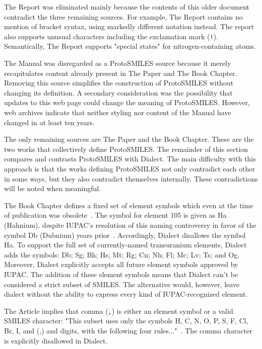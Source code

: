\documentclass{article}
\def\ttt{\texttt}
\begin{document}
The Report was eliminated mainly because the contents of this older document contradict the three remaining sources. For example, The Report contains no mention of bracket syntax, using markedly different notation instead. The report also supports unusual characters including the exclamation mark (\ttt{!}). Semantically, The Report supports "special states" for nitrogen-containing atoms.

The Manual was disregarded as a ProtoSMILES source because it merely recapitulates content already present in The Paper and The Book Chapter. Removing this source simplifies the construction of ProtoSMILES without changing its definition. A secondary consideration was the possibility that updates to this web page could change the meaning of ProtoSMILES. However, web archives indicate that neither styling nor content of the Manual have changed in at least ten years.

The only remaining sources are The Paper and the Book Chapter. These are the two works that collectively define ProtoSMILES. The remainder of this section compares and contrasts ProtoSMILES with Dialect. The main difficulty with this approach is that the works defining ProtoSMILES not only contradict each other in some ways, but they also contradict themselves internally. These contradictions will be noted when meaningful.

The Book Chapter defines a fixed set of element symbols which even at the time of publication was obsolete~\cite[p.~83]{weininger:2008}. The symbol for element 105 is given as Ha (Hahnium), despite IUPAC's resolution of this naming controversy in favor of the symbol Db (Dubnium) years prior~\cite{sageson:1997}. Accordingly, Dialect disallows the symbol Ha. To support the full set of currently-named transuranium elements, Dialect adds the symbols: Db; Sg; Bh; Hs; Mt; Rg; Cn; Nh; Fl; Mc; Lv; Ts; and Og. Moreover, Dialect explicitly accepts all future element symbols approved by IUPAC. The addition of these element symbols means that Dialect can't be considered a strict subset of SMILES. The alternative would, however, leave dialect without the ability to express every kind of IUPAC-recognized element.

The Article implies that comma (\ttt{,}) is either an element symbol or a valid SMILES character: "This subset uses only the symbols H, C, N, O, P, S, F, Cl, Br, I, and (,) and digits, with the following four rules..."~\cite[p.~33]{weininger:1988}. The comma character is explicitly disallowed in Dialect.
\end{document}
